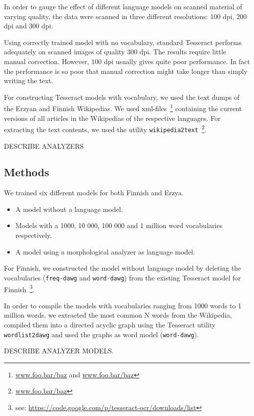 \documentclass[b5paper]{article}
\begin{document}
In order to gauge the effect of different language models on scanned
material of varying quality, the data were scanned in three different
resolutions: 100 dpi, 200 dpi and 300 dpi.

Using correctly trained model with no vocabulary, standard Tesseract
performs adequately on scanned images of quality 300 dpi. The results
require little manual correction. However, 100 dpi usually gives quite
poor performance. In fact the performance is so poor that manual
correction might take longer than simply writing the text.

For constructing Tesseract models with vocabulary, we used the text
dumps of the Erzyan and Finnish Wikipedias. We used
xml-files~\footnote{\url{www.foo.bar/baz} and \url{www.foo.bar/baz}}
containing the current versions of all articles in the Wikipedias of
the respective languages. For extracting the text contents, we used
the utility {\tt wikipedia2text}~\footnote{\url{www.foo.bar/baz}}.

DESCRIBE ANALYZERS

\subsection{Methods}
We trained six different models for both Finnish and Erzya.
\begin{itemize}
\item A model without a language model.
\item Models with a 1000, 10 000, 100 000 and 1 million word vocabularies respectively.
\item A model using a morphological analyzer as language model.
\end{itemize}

For Finnish, we constructed the model without language model by
deleting the vocabularies ({\tt freq-dawg} and {\tt word-dawg}) from
the existing Tesseract model for Finnish~\footnote{see:
  \url{https://code.google.com/p/tesseract-ocr/downloads/list}}.

In order to compile the models with vocabularies ranging from 1000
words to 1 million words, we extracted the most common N words from
the Wikipedia, compiled them into a directed acyclic graph using the
Tesseract utility {\tt wordlist2dawg} and used the graphs as word
model ({\tt word-dawg}).

DESCRIBE ANALYZER MODELS.
\end{document}
